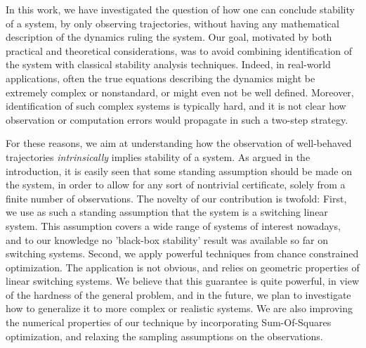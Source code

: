 In this work, we have investigated the question of how one can conclude stability of a system, by only observing trajectories, without having any mathematical description of the dynamics ruling the system.   Our goal, motivated by both practical and theoretical considerations, was to avoid combining identification of the system with classical stability analysis techniques.  Indeed, in real-world applications, often the true equations describing the dynamics might be extremely complex or nonstandard, or might even not be well defined. Moreover, identification of such complex systems is typically hard, and it is not clear how observation or computation errors would propagate in such a two-step strategy. 

For these reasons, we aim at understanding how the observation of well-behaved trajectories \emph{intrinsically} implies stability of a system.  As argued in the introduction, it is easily seen that some standing assumption should be made on the system, in order to allow for any sort of nontrivial certificate, solely from a finite number of observations. The novelty of our contribution is twofold: 
First, we use as such a standing assumption that the system is a switching linear system.  This assumption covers a wide range of systems of interest nowadays, and to our knowledge no 'black-box stability' result was available so far on switching systems.  
Second, we apply powerful techniques from chance constrained optimization.  The application is not obvious, and relies on geometric properties of linear switching systems. We believe that this guarantee is quite powerful, in view of the hardness of the general problem, and in the future, we plan to investigate how to generalize it to more complex or realistic systems.  We are also improving the numerical properties of our technique by incorporating Sum-Of-Squares optimization, and relaxing the sampling assumptions on the observations.